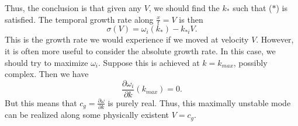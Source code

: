 \documentclass[a4paper]{article}
\begin{document}
Thus, the conclusion is that given any $V$, we should find the $k_*$ such that ($*$) is satisfied. The temporal growth rate along $\frac{x}{t} = V$ is then
\[
  \sigma(V) = \omega_i(k_*) - k_{*i}V.
\]
This is the growth rate we would experience if we moved at velocity $V$. However, it is often more useful to consider the absolute growth rate. In this case, we should try to maximize $\omega_i$. Suppose this is achieved at $k = k_{max}$, possibly complex. Then we have
\[
  \frac{\partial \omega_i}{\partial k}(k_{max}) = 0.
\]
But this means that $c_g = \frac{\partial \omega}{\partial k}$ is purely real. Thus, this maximally unstable mode can be realized along some physically existent $V = c_g$.


%
%
%
\end{document}
